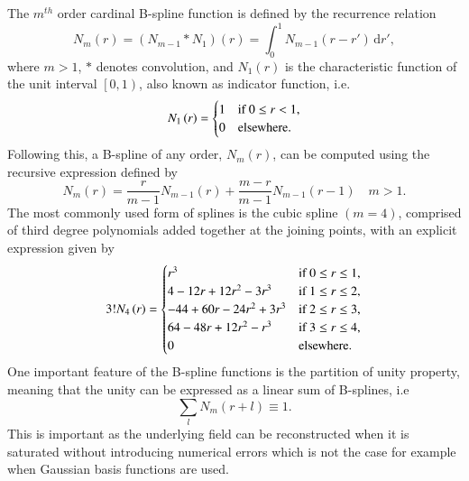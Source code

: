 \documentclass[review,authoryear,3p]{elsarticle}
\begin{document}
The $m^{th}$  order cardinal B-spline function is defined by the recurrence relation \citep{Chui1992} 
\begin{equation}
N_{m}\left(r\right) = \left(N_{m-1}\ast N_{1}\right)\left(r\right) = \int_0^{1} N_{m-1}\left( r-r'\right)\,\mathrm{d}r',
\label{SplineConvolutionIntegral}
\end{equation}
where $m>1$, $\ast$ denotes convolution, and $N_1\left(r\right)$ is the characteristic function of the unit interval $\left[ 0,1\right)$, also known as indicator function, i.e.
\begin{equation}
N_{1}\left(r\right)=
\begin{cases}
1 & \text{if $ 0\le r<1$}, \\
0 & \mathrm{elsewhere}.
\end{cases}
\end{equation}
Following this, a B-spline of any order, $N_m(r)$, can be computed using the recursive expression defined by \citet{DeBoor2001}
\begin{equation}\label{eq:MRA-DoBoorFormula}
 N_{m}\left(r\right)=\frac{r}{m-1}N_{m-1}\left(r\right)+\frac{m-r}{m-1}N_{m-1}\left(r-1\right) \quad m>1.
 \end{equation}
The most commonly used form of splines is the cubic spline $\left(m=4\right)$, comprised of third degree polynomials added together at the joining points, with an explicit expression given by
\begin{align}
3!N_{4}\left(r\right)=
\begin{cases}
r^3 & \text{if $ 0\le r\le1$}, \\
4-12r+12r^2-3r^3 & \text{if $1\le r\le2$}, \\
-44+60r-24r^2+3r^3 & \text{if $2\le r\le3$}, \\
64-48r+12r^2-r^3 & \text{if $3\le r\le4$}, \\
0 & \mathrm{elsewhere}.
\end{cases}
\end{align}
One important feature of the B-spline functions is the partition of unity property, meaning that the unity can be expressed as a linear sum of B-splines, i.e
\begin{equation}
	\sum_{l}N_m(r+l)\equiv1.
	\end{equation}
This is important as the underlying field can be reconstructed when it is saturated without introducing numerical errors which is not the case for example when Gaussian basis functions are used.
	
\end{document}
